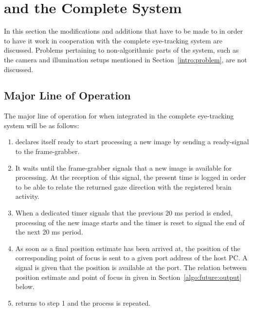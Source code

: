 
\section{{\octopus} and the Complete System}
\label{algo:future}

In this section the modifications and additions that have to be made
to {\octopus} in order to have it work in cooperation with the
complete eye-tracking system are discussed.  Problems pertaining to
non-algorithmic parts of the system, such as the camera and
illumination setups mentioned in Section~\ref{intro:problem}, are not
discussed.

\subsection{Major Line of Operation}
\label{algo:future:line}

The major line of operation for {\octopus} when integrated in the
complete eye-tracking system will be as follows: 

\begin{enumerate}
\item {\octopus} declares itself ready to start processing a new
  image by sending a ready-signal to the frame-grabber.
\item It waits until the frame-grabber signals that a new image is
  available for processing.  At the reception of this signal, the
  present time is logged in order to be able to relate the returned
  gaze direction with the registered brain activity.
\item When a dedicated timer signals that the previous 20 ms period is
  ended, processing of the new image starts and the timer is reset to
  signal the end of the next 20 ms period.
\item As soon as a final position estimate has been arrived at, the
  position of the corresponding point of focus is sent to a given port
  address of the host PC.  A signal is given that the position is
  available at the port.  The relation between position estimate and
  point of focus in given in Section~\ref{algo:future:output} below.
\item {\octopus} returns to step 1 and the process is repeated.
\end{enumerate}

